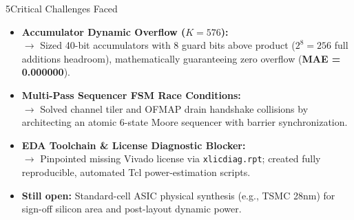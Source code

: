 \documentclass{article}
\begin{document}
\begin{minipage}[t]{0.488\textwidth}\vspace{0pt}
\begin{posterblock}[equal height group=rowA]{5}{Critical Challenges Faced}
\begin{itemize}
  \item \textbf{Accumulator Dynamic Overflow ($K=576$):}\\
        $\rightarrow$ Sized 40-bit accumulators with 8 guard bits above product ($2^8 = 256$ full additions headroom), mathematically guaranteeing zero overflow (\textbf{MAE = 0.000000}).
  \item \textbf{Multi-Pass Sequencer FSM Race Conditions:}\\
        $\rightarrow$ Solved channel tiler and OFMAP drain handshake collisions by architecting an atomic 6-state Moore sequencer with barrier synchronization.
  \item \textbf{EDA Toolchain \& License Diagnostic Blocker:}\\
        $\rightarrow$ Pinpointed missing Vivado license via \texttt{xlicdiag.rpt}; created fully reproducible, automated Tcl power-estimation scripts.
  \item \textbf{Still open:} Standard-cell ASIC physical synthesis (e.g., TSMC 28nm) for sign-off silicon area and post-layout dynamic power.
\end{itemize}
\end{posterblock}
\end{minipage}
\end{document}
